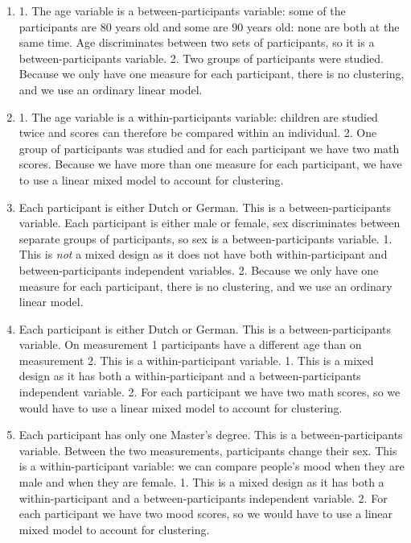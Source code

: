 \documentclass[]{book}\usepackage[]{graphicx}\usepackage[]{color}
\begin{document}
\begin{enumerate}

\item 

1. The age variable is a between-participants variable: some of the participants are 80 years old and some are 90 years old: none are both at the same time. Age discriminates between two sets of participants, so it is a between-participants variable.
2. Two groups of participants were studied. Because we only have one measure for each participant, there is no clustering, and we use an ordinary linear model.


\item
1. The age variable is a within-participants variable: children are studied twice and scores can therefore be compared within an individual.
2. One group of participants was studied and for each participant we have two math scores. Because we have more than one measure for each participant, we have to use a linear mixed model to account for clustering.

\item 
Each participant is either Dutch or German. This is a between-participants variable. Each participant is either male or female, sex discriminates between separate groups of participants, so sex is a between-participants variable.
1. This is \textit{not} a mixed design as it does not have both within-participant and between-participants independent variables. 
2. Because we only have one measure for each participant, there is no clustering, and we use an ordinary linear model.


\item 
Each participant is either Dutch or German. This is a between-participants variable.
On measurement 1 participants have a different age than on measurement 2. This is a within-participant variable.
1. This is a mixed design as it has both a within-participant and a between-participants independent variable. 
2. For each participant we have two math scores, so we would have to use a linear mixed model to account for clustering.

\item
Each participant has only one Master’s degree. This is a between-participants variable. Between the two measurements, participants change their sex. This is a within-participant variable: we can compare people's mood when they are male and when they are female.
1. This is a mixed design as it has both a within-participant and a between-participants independent variable. 
2. For each participant we have two mood scores, so we would have to use a linear mixed model to account for clustering.



\end{enumerate}
\end{document}
